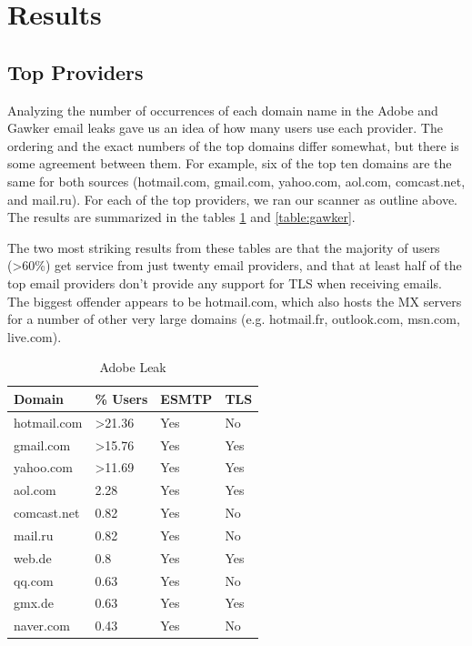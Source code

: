 \section{Results}
\subsection{Top Providers}
Analyzing the number of occurrences of each domain name in the Adobe and Gawker 
email leaks gave us an idea of how many users use each provider.  The ordering 
and the exact numbers of the top domains differ somewhat, but there is some 
agreement between them.  For example, six of the top ten domains are the same 
for both sources (hotmail.com, gmail.com, yahoo.com, aol.com, comcast.net, and 
mail.ru).  For each of the top providers, we ran our scanner as outline 
above.  The results are summarized in the tables \ref{table:adobe} and 
\ref{table:gawker}.

The two most striking results from these tables are that the majority of users 
(\textgreater60\%) get service from just twenty email providers, and that at least half of 
the top email providers don’t provide any support for TLS when receiving emails.  
The biggest offender appears to be hotmail.com, which also hosts the MX servers 
for a number of other very large domains (e.g. hotmail.fr, outlook.com, msn.com, 
live.com).

\begin{table}
    \caption{Adobe Leak}
    \centering
    \label{table:adobe}
    \begin{tabular}{|l|l|l|l|}
        \hline
        Domain & \% Users & ESMTP & TLS \\
        \hline
        hotmail.com & \textgreater21.36 & Yes & No \\
        gmail.com & \textgreater15.76 & Yes & Yes \\
        yahoo.com & \textgreater11.69 & Yes & Yes \\
        aol.com & 2.28 & Yes & Yes \\
        comcast.net & 0.82 & Yes & No \\
        mail.ru & 0.82 & Yes & No \\
        web.de & 0.8 & Yes & Yes \\
        qq.com & 0.63 & Yes & No \\
        gmx.de & 0.63 & Yes & Yes \\
        naver.com & 0.43 & Yes & No \\
        \hline
    \end{tabular}
\end{table}

